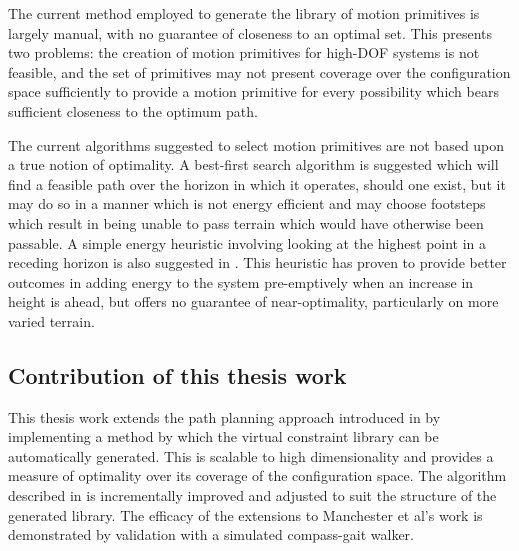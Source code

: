 The current method employed to generate the library of motion primitives is largely manual, with no guarantee of closeness to an optimal set. This presents two problems: the creation of motion primitives for high-DOF systems is not feasible, and the set of primitives may not present coverage over the configuration space sufficiently to provide a motion primitive for every possibility which bears sufficient closeness to the optimum path. 

The current algorithms suggested to select motion primitives are not based upon a true notion of optimality. A best-first search algorithm is suggested which will find a feasible path over the horizon in which it operates, should one exist, but it may do so in a manner which is not energy efficient and may choose footsteps which result in being unable to pass terrain which would have otherwise been passable. A simple energy heuristic involving looking at the highest point in a receding horizon is also suggested in \cite{manchester13planning}. This heuristic has proven to provide better outcomes in adding energy to the system pre-emptively when an increase in height is ahead, but offers no guarantee of near-optimality, particularly on more varied terrain. 

\subsection{Contribution of this thesis work}
This thesis work extends the path planning approach introduced in \cite{manchester13planning} by implementing a method by which the virtual constraint library can be automatically generated. This is scalable to high dimensionality and provides a measure of optimality over its coverage of the configuration space. The algorithm described in \cite{manchester13planning} is incrementally improved and adjusted to suit the structure of the generated library. The efficacy of the extensions to Manchester et al's work is demonstrated by validation with a simulated compass-gait walker.